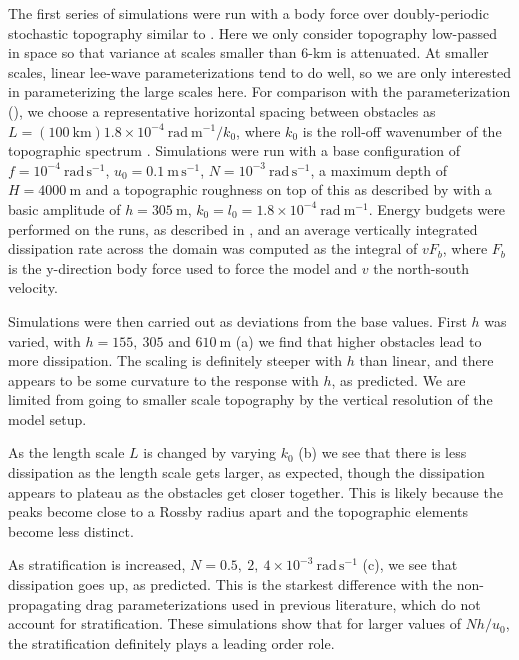 \documentclass[twocol]{ametsocV5}
\begin{document}
The first series of simulations were run with a body force over doubly-periodic stochastic topography similar to \citet{klymak18}. Here we only consider topography low-passed in space so that variance at scales smaller than 6-km is attenuated.  At smaller scales, linear lee-wave parameterizations tend to do well, so we are only interested in parameterizing the large scales here.  For comparison with the parameterization (), we choose a representative horizontal spacing between obstacles as $L = \left(100 \ \mathrm{km}\right) 1.8 \times 10^{-4}\ \mathrm{rad\ m^{-1}} / k_0$, where $k_0$ is the roll-off wavenumber of the topographic spectrum \citep{klymak18}.  Simulations were run with a base configuration of $f=10^{-4}\ \mathrm{rad\, s^{-1}}$, $u_0=0.1\ \mathrm{m\,s^{-1}}$, $N=10^{-3}\ \mathrm{rad\, s^{-1}}$, a maximum depth of $H=4000\ \mathrm{m}$ and a topographic roughness on top of this as described by  with a basic amplitude of $h = 305\ \mathrm{m}$, $k_0 = l_0 = 1.8\times10^{-4}\ \mathrm{rad\ m^{-1}}$. Energy budgets were performed on the runs, as described in \citep{klymak18}, and an average vertically integrated dissipation rate across the domain was computed as the integral of $v F_b$, where $F_b$ is the y-direction body force used to force the model and $v$ the north-south velocity.


Simulations were then carried out as deviations from the base values.  First $h$ was varied, with $h = 155,\ 305$ and $610\ \mathrm{m}$ (a) we find that higher obstacles lead to more dissipation.  The scaling is definitely steeper with $h$ than linear, and there appears to be some curvature to the response with $h$, as predicted.  We are limited from going to smaller scale topography by the vertical resolution of the model setup.  


As the length scale $L$ is changed by varying  $k_0$ (b) we see that there is less dissipation as the length scale gets larger, as expected, though the dissipation appears to plateau as the obstacles get closer together.  This is likely because the peaks become close to a Rossby radius apart and the topographic elements become less distinct.  

As stratification is increased, $N = 0.5,\ 2,\ 4\times 10^{-3}\ \mathrm{rad\, s^{-1}}$ (c), we see that dissipation goes up, as predicted.  This is the starkest difference with the non-propagating drag parameterizations used in previous literature, which do not account for stratification.  These simulations show that for  larger values of $Nh/u_0$, the stratification definitely plays a leading order role.  
\end{document}
